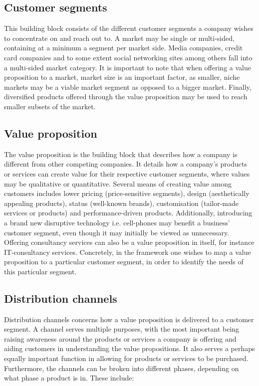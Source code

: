 \subsection{Customer segments}
This building block consists of the different customer segments a company wishes to concentrate on and reach out to. A market may be single or multi-sided, containing at a minimum a segment per market side. Media companies, credit card companies and to some extent social networking sites among others fall into a multi-sided market category. It is important to note that when offering a value proposition to a market, market size is an important factor, as smaller, niche markets may be a viable market segment as opposed to a bigger market. Finally, diversified products offered through the value proposition may be used to reach smaller subsets of the market.
\subsection{Value proposition}
The value proposition is the building block that describes how a company is different from other competing companies. It details how a company's products or services can create value for their respective customer segments, where values may be qualitative or quantitative. Several means of creating value among customers  includes lower pricing (price-sensitive segments), design (aesthetically appealing products), status (well-known brands), customisation (tailor-made services or products) and performance-driven products. Additionally, introducing a brand new disruptive technology i.e. cell-phones may benefit a business' customer segment, even though it may initially be viewed as unnecessary. Offering consultancy services can also be a value proposition in itself, for instance IT-consultancy services. Concretely, in the framework one wishes to map a value proposition to a particular customer segment, in order to identify the needs of this particular segment.
\subsection{Distribution channels}
Distribution channels concerns how a value proposition is delivered to a customer segment. A channel serves multiple purposes, with the most important being raising awareness around the products or services a company is offering and aiding customers in understanding the value propositions. It also serves a perhaps equally important function in allowing for products or services to be purchased. Furthermore, the channels can be broken into different phases, depending on what phase a product is in. These include:

